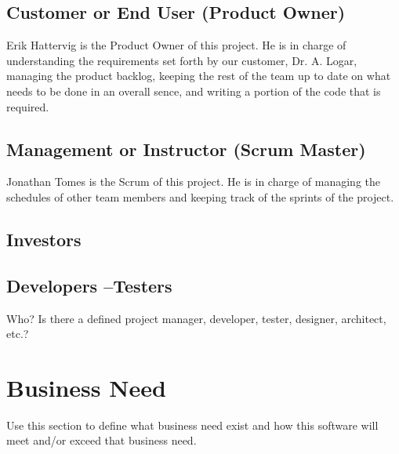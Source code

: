 

\subsection{Customer or End User (Product Owner)}
Erik Hattervig is the Product Owner of this project. He is in charge of understanding the requirements set forth by our
customer, Dr. A. Logar, managing the product backlog, keeping the rest of the team up to date on what
needs to be done in an overall sence, and writing a portion of the code that is required.


\subsection{Management or Instructor (Scrum Master)}
Jonathan Tomes is the Scrum of this project. He is in charge of managing the schedules of other team members
and keeping track of the sprints of the project.



\subsection{Investors}




\subsection{Developers --Testers}
Who?  Is there a defined project manager, developer, tester, designer, architect, 
etc.? 


\section{Business Need}
Use this section to define what business need exist and how this software will 
meet and/or exceed that business need.   

